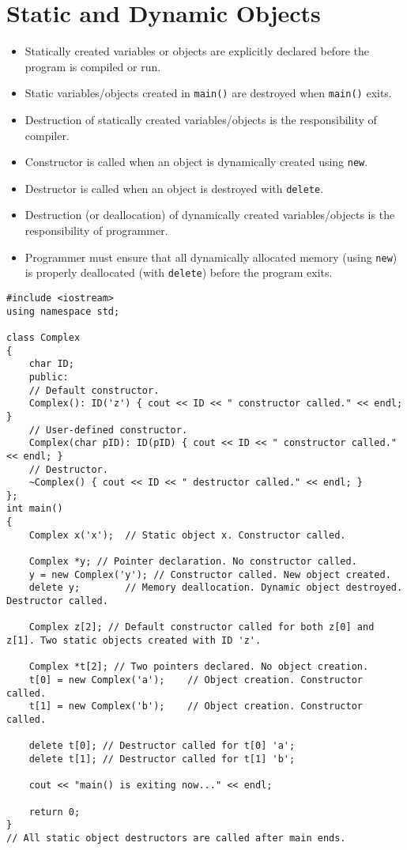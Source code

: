 \documentclass[12pt,a4paper]{article}
\begin{document}
\section{Static and Dynamic Objects}
\begin{itemize}
\item Statically created variables or objects are explicitly declared before the program is compiled or run.
\item Static variables/objects created in \verb|main()| are destroyed when \verb|main()| exits.
\item Destruction of statically created variables/objects is the responsibility of compiler.
\item Constructor is called when an object is dynamically created using \verb|new|.
\item Destructor is called when an object is destroyed with \verb|delete|.
\item Destruction (or deallocation) of dynamically created variables/objects is the responsibility of programmer.
\item Programmer must ensure that all dynamically allocated memory (using \verb|new|) is properly deallocated (with \verb|delete|) before the program exits.
\end{itemize}
\begin{lstlisting}[caption={Static and Dynamic Objects}]
#include <iostream>
using namespace std;

class Complex
{
	char ID;
	public:
	// Default constructor.
	Complex(): ID('z') { cout << ID << " constructor called." << endl; }
	// User-defined constructor.
	Complex(char pID): ID(pID) { cout << ID << " constructor called." << endl; }
	// Destructor.
	~Complex() { cout << ID << " destructor called." << endl; }
};
int main()
{
	Complex x('x');  // Static object x. Constructor called.
	
	Complex *y; // Pointer declaration. No constructor called.
	y = new Complex('y'); // Constructor called. New object created.
	delete y;        // Memory deallocation. Dynamic object destroyed. Destructor called.
	
	Complex z[2]; // Default constructor called for both z[0] and z[1]. Two static objects created with ID 'z'.
	
	Complex *t[2]; // Two pointers declared. No object creation.
	t[0] = new Complex('a');	// Object creation. Constructor called.
	t[1] = new Complex('b');    // Object creation. Constructor called.
	
	delete t[0]; // Destructor called for t[0] 'a';
	delete t[1]; // Destructor called for t[1] 'b';
	
	cout << "main() is exiting now..." << endl;
	
	return 0;
}
// All static object destructors are called after main ends.
\end{lstlisting}
\end{document}
